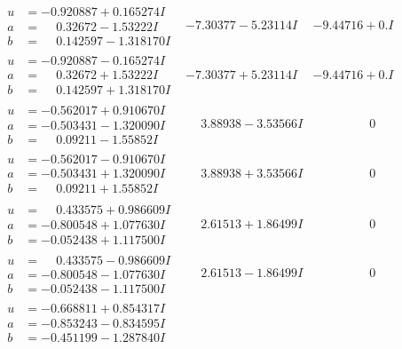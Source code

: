 \documentclass[1p]{elsarticle_modified}
\theoremstyle{definition}
\begin{document}
$$\begin{array}{c|c|c}
\begin{aligned}
u &= -0.920887 + 0.165274 I \\
a &= \phantom{-}0.32672 - 1.53222 I \\
b &= \phantom{-}0.142597 - 1.318170 I\end{aligned}
 & -7.30377 - 5.23114 I & -9.44716 + 0. I\phantom{ +0.000000I} \\ \hline\begin{aligned}
u &= -0.920887 - 0.165274 I \\
a &= \phantom{-}0.32672 + 1.53222 I \\
b &= \phantom{-}0.142597 + 1.318170 I\end{aligned}
 & -7.30377 + 5.23114 I & -9.44716 + 0. I\phantom{ +0.000000I} \\ \hline\begin{aligned}
u &= -0.562017 + 0.910670 I \\
a &= -0.503431 - 1.320090 I \\
b &= \phantom{-}0.09211 - 1.55852 I\end{aligned}
 & \phantom{-}3.88938 - 3.53566 I & \phantom{-0.000000 } 0 \\ \hline\begin{aligned}
u &= -0.562017 - 0.910670 I \\
a &= -0.503431 + 1.320090 I \\
b &= \phantom{-}0.09211 + 1.55852 I\end{aligned}
 & \phantom{-}3.88938 + 3.53566 I & \phantom{-0.000000 } 0 \\ \hline\begin{aligned}
u &= \phantom{-}0.433575 + 0.986609 I \\
a &= -0.800548 + 1.077630 I \\
b &= -0.052438 + 1.117500 I\end{aligned}
 & \phantom{-}2.61513 + 1.86499 I & \phantom{-0.000000 } 0 \\ \hline\begin{aligned}
u &= \phantom{-}0.433575 - 0.986609 I \\
a &= -0.800548 - 1.077630 I \\
b &= -0.052438 - 1.117500 I\end{aligned}
 & \phantom{-}2.61513 - 1.86499 I & \phantom{-0.000000 } 0 \\ \hline\begin{aligned}
u &= -0.668811 + 0.854317 I \\
a &= -0.853243 - 0.834595 I \\
b &= -0.451199 - 1.287840 I\end{aligned}

\end{array}$$
\end{document}

